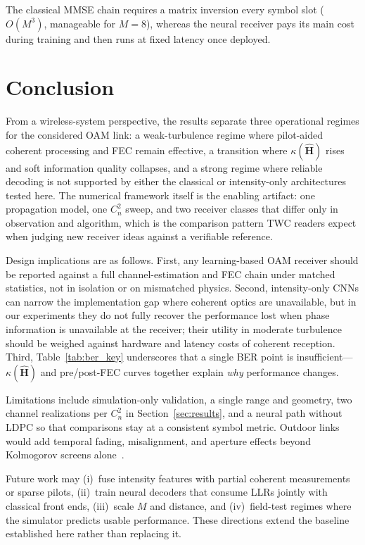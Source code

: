 \documentclass[journal]{IEEEtran}
\begin{document}

The classical MMSE chain requires a matrix inversion every symbol slot ($O(M^3)$, manageable for $M=8$), whereas the neural receiver pays its main cost during training and then runs at fixed latency once deployed.

\section{Conclusion}
\label{sec:conclusion}

From a wireless-system perspective, the results separate three operational regimes for the considered OAM link: a weak-turbulence regime where pilot-aided coherent processing and FEC remain effective, a transition where $\kappa(\hat{\mathbf{H}})$ rises and soft information quality collapses, and a strong regime where reliable decoding is not supported by either the classical or intensity-only architectures tested here. The numerical framework itself is the enabling artifact: one propagation model, one $C_n^2$ sweep, and two receiver classes that differ only in observation and algorithm, which is the comparison pattern TWC readers expect when judging new receiver ideas against a verifiable reference.

Design implications are as follows. First, any learning-based OAM receiver should be reported against a full channel-estimation and FEC chain under matched statistics, not in isolation or on mismatched physics. Second, intensity-only CNNs can narrow the implementation gap where coherent optics are unavailable, but in our experiments they do not fully recover the performance lost when phase information is unavailable at the receiver; their utility in moderate turbulence should be weighed against hardware and latency costs of coherent reception. Third, Table~\ref{tab:ber_key} underscores that a single BER point is insufficient---$\kappa(\hat{\mathbf{H}})$ and pre/post-FEC curves together explain \emph{why} performance changes.

Limitations include simulation-only validation, a single range and geometry, two channel realizations per $C_n^2$ in Section~\ref{sec:results}, and a neural path without LDPC so that comparisons stay at a consistent symbol metric. Outdoor links would add temporal fading, misalignment, and aperture effects beyond Kolmogorov screens alone~\cite{andrews2005laser}.

Future work may (i)~fuse intensity features with partial coherent measurements or sparse pilots, (ii)~train neural decoders that consume LLRs jointly with classical front ends, (iii)~scale $M$ and distance, and (iv)~field-test regimes where the simulator predicts usable performance. These directions extend the baseline established here rather than replacing it.



\end{document}
